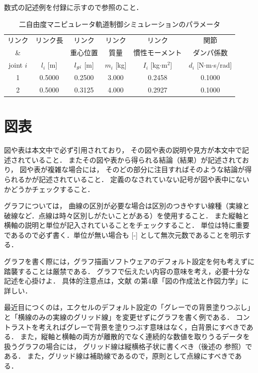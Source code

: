 数式の記述例を付録に示すので参照のこと．


\begin{table}[t]
	\caption{二自由度マニピュレータ軌道制御シミュレーションのパラメータ}							\label{table:c3/parameters}
	\begin{center}
		\small
		\begin{tabular}{|c|c|c|c|c|c|}																								\hline
			リンク		& リンク長	& リンク			& リンク		& リンク					& 関節							\\
			\&			&			& 重心位置			& 質量			& 慣性モーメント			& ダンパ係数					\\
			joint $i$	& $l_i$ [m]	& $l_{\mathit{gi}}$ [m]	& $m_i$ [kg]	& $I_i$ [kg$\cdot$m${}^2$]	& $d_i$ [N$\cdot$m$\cdot$s/rad]	\\ \hline
			1			& 0.5000	& 0.2500			& 3.000			& 0.2458					& 0.1000						\\
			2			& 0.5000	& 0.3125			& 4.000			& 0.2927					& 0.1000						\\ \hline
        \end{tabular}
    \end{center}
\end{table}


\section{図表}

図や表は本文中で必ず引用されており，
その図や表の説明や見方が本文中で記述されていること．
またその図や表から得られる結論（結果）が記述されており，
図や表が複雑な場合には，
そのどの部分に注目すればそのような結論が得られるかが記述されていること．
定義のなされていない記号が図や表中にないかどうかチェックすること．

グラフについては，
曲線の区別が必要な場合は区別のつきやすい線種（実線と破線など．点線は時々区別しがたいことがある）を使用すること．
また縦軸と横軸の説明と単位が記入されていることをチェックすること．
単位は特に重要であるので必ず書く．単位が無い場合も [-] として無次元数であることを明示する．

グラフを書く際には，グラフ描画ソフトウェアのデフォルト設定を何も考えずに踏襲することは厳禁である．
グラフで伝えたい内容の意味を考え，必要十分な記述を心掛けよ．
具体的注意点は，文献 \Cite{04} の第4章「図の作成法と作図力学」に詳しい．

最近目につくのは，エクセルのデフォルト設定の「グレーでの背景塗りつぶし」と「横線のみの実線のグリッド線」を変更せずにグラフを書く例である．
コントラストを考えればグレーで背景を塗りつぶす意味はなく，白背景にすべきである．
また，縦軸と横軸の両方が離散的でなく連続的な数値を取りうるデータを扱うグラフの場合には，
グリッド線は縦横格子状に書くべき（後述の  参照）である．
また，グリッド線は補助線であるので，原則として点線にすべきである．

